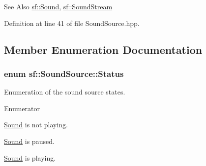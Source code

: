 \begin{DoxySeeAlso}{See Also}
\hyperlink{classsf_1_1Sound}{sf\-::\-Sound}, \hyperlink{classsf_1_1SoundStream}{sf\-::\-Sound\-Stream} 
\end{DoxySeeAlso}


Definition at line 41 of file Sound\-Source.\-hpp.



\subsection{Member Enumeration Documentation}
\hypertarget{classsf_1_1SoundSource_ac43af72c98c077500b239bc75b812f03}{
\subsubsection[{Status}]{\setlength{\rightskip}{0pt plus 5cm}enum {\bf sf\-::\-Sound\-Source\-::\-Status}}}\label{classsf_1_1SoundSource_ac43af72c98c077500b239bc75b812f03}


Enumeration of the sound source states. 

\begin{Desc}
\item[Enumerator]\par
\begin{description}
\item[{\em 
\hypertarget{classsf_1_1SoundSource_ac43af72c98c077500b239bc75b812f03adabb01e8aa85b2f54b344890addf764a}{Stopped}\label{classsf_1_1SoundSource_ac43af72c98c077500b239bc75b812f03adabb01e8aa85b2f54b344890addf764a}
}]\hyperlink{classsf_1_1Sound}{Sound} is not playing. \item[{\em 
\hypertarget{classsf_1_1SoundSource_ac43af72c98c077500b239bc75b812f03ac3ca1fcc0394267c9bdbe3dc0a8a7e41}{Paused}\label{classsf_1_1SoundSource_ac43af72c98c077500b239bc75b812f03ac3ca1fcc0394267c9bdbe3dc0a8a7e41}
}]\hyperlink{classsf_1_1Sound}{Sound} is paused. \item[{\em 
\hypertarget{classsf_1_1SoundSource_ac43af72c98c077500b239bc75b812f03af07bdea9f70ef7606dfc9f955beeee18}{Playing}\label{classsf_1_1SoundSource_ac43af72c98c077500b239bc75b812f03af07bdea9f70ef7606dfc9f955beeee18}
}]\hyperlink{classsf_1_1Sound}{Sound} is playing. \end{description}
\end{Desc}


